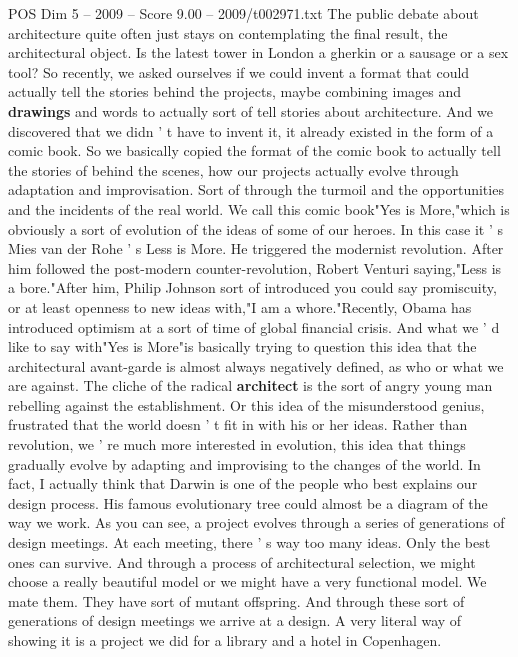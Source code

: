 \begin{textsample}{POS Dim 5 – 2009 – Score 9.00 – 2009/t002971.txt}  \label{ex:f5_pos_034}
The public debate about architecture quite often just stays on contemplating the final result, the architectural object.
Is the latest tower in London a gherkin or a sausage or a sex tool?
So recently, we asked ourselves if we could invent a format that could actually tell the stories behind the projects, maybe combining images and \textbf{drawings} and words to actually sort of tell stories about architecture.
And we discovered that we didn ' t have to invent it, it already existed in the form of a comic book.
So we basically copied the format of the comic book to actually tell the stories of behind the scenes, how our projects actually evolve through adaptation and improvisation.
Sort of through the turmoil and the opportunities and the incidents of the real world.
We call this comic book"Yes is More,"which is obviously a sort of evolution of the ideas of some of our heroes.
In this case it ' s Mies van der Rohe ' s Less is More.
He triggered the modernist revolution.
After him followed the post-modern counter-revolution, Robert Venturi saying,"Less is a bore."After him, Philip Johnson sort of introduced you could say promiscuity, or at least openness to new ideas with,"I am a whore."Recently, Obama has introduced optimism at a sort of time of global financial crisis.
And what we ' d like to say with"Yes is More"is basically trying to question this idea that the architectural avant-garde is almost always negatively defined, as who or what we are against.
The cliche of the radical \textbf{architect} is the sort of angry young man rebelling against the establishment.
Or this idea of the misunderstood genius, frustrated that the world doesn ' t fit in with his or her ideas.
Rather than revolution, we ' re much more interested in evolution, this idea that things gradually evolve by adapting and improvising to the changes of the world.
In fact, I actually think that Darwin is one of the people who best explains our design process.
His famous evolutionary tree could almost be a diagram of the way we work.
As you can see, a project evolves through a series of generations of design meetings.
At each meeting, there ' s way too many ideas.
Only the best ones can survive.
And through a process of architectural selection, we might choose a really beautiful model or we might have a very functional model.
We mate them.
They have sort of mutant offspring.
And through these sort of generations of design meetings we arrive at a design.
A very literal way of showing it is a project we did for a library and a hotel in Copenhagen.

\end{textsample}
